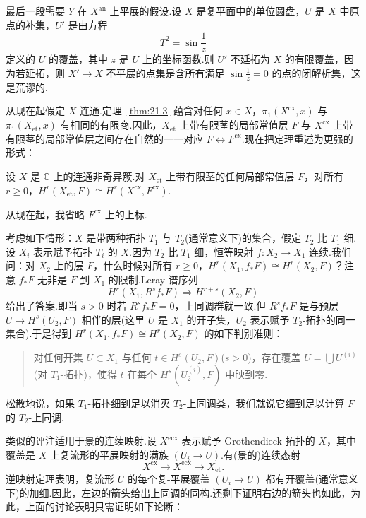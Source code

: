 \begin{example}\label{ex:21.4}
最后一段需要 $Y$ 在 $X^{\mathrm{an}}$ 上平展的假设.设 $X$ 是复平面中的单位圆盘，$U$ 是 $X$ 中原点的补集，$U'$ 是由方程
\[
T^{2} = \sin\frac{1}{z}
\]
定义的 $U$ 的覆盖，其中 $z$ 是 $U$ 上的坐标函数.则 $U'$ 不延拓为 $X$ 的有限覆盖，因为若延拓，则 $X' \to X$ 不平展的点集是含所有满足 $\sin\frac{1}{z} = 0$ 的点的闭解析集，这是荒谬的.
\end{example}

从现在起假定 $X$ 连通.定理~\ref{thm:21.3} 蕴含对任何 $x \in X$，$\pi_1(X^{\mathrm{cx}}, x)$ 与 $\pi_1(X_{\mathrm{et}}, x)$ 有相同的有限商.因此，$X_{\mathrm{et}}$ 上带有限茎的局部常值层 $F$ 与 $X^{\mathrm{cx}}$ 上带有限茎的局部常值层之间存在自然的一一对应 $F \leftrightarrow F^{\mathrm{cx}}$.现在把定理重述为更强的形式：

\begin{theorem}\label{thm:21.5}
设 $X$ 是 $\mathbb{C}$ 上的连通非奇异簇.对 $X_{\mathrm{et}}$ 上带有限茎的任何局部常值层 $F$，对所有 $r \geq 0$，$H^{r}(X_{\mathrm{et}}, F) \cong H^{r}(X^{\mathrm{cx}}, F^{\mathrm{cx}})$.
\end{theorem}

从现在起，我省略 $F^{\mathrm{cx}}$ 上的上标.

考虑如下情形：$X$ 是带两种拓扑 $T_1$ 与 $T_2$(通常意义下)的集合，假定 $T_2$ 比 $T_1$ 细.设 $X_i$ 表示赋予拓扑 $T_i$ 的 $X$.因为 $T_2$ 比 $T_1$ 细，恒等映射 $f \colon X_2 \to X_1$ 连续.我们问：对 $X_2$ 上的层 $F$，什么时候对所有 $r \geq 0$，$H^{r}(X_1, f_{*}F) \cong H^{r}(X_2, F)$？注意 $f_{*}F$ 无非是 $F$ 到 $X_1$ 的限制.Leray 谱序列
\[
H^{r}(X_1, R^{s}f_{*}F) \Rightarrow H^{r+s}(X_2, F)
\]
给出了答案.即当 $s > 0$ 时若 $R^{s}f_{*}F = 0$，上同调群就一致.但 $R^{s}f_{*}F$ 是与预层 $U \mapsto H^{s}(U_2, F)$ 相伴的层(这里 $U$ 是 $X_1$ 的开子集，$U_2$ 表示赋予 $T_2$-拓扑的同一集合).于是得到 $H^{r}(X_1, f_{*}F) \cong H^{r}(X_2, F)$ 的如下判别准则：
\begin{quote}
对任何开集 $U \subset X_1$ 与任何 $t \in H^{s}(U_2, F)$($s > 0$)，存在覆盖 $U = \bigcup U^{(i)}$(对 $T_1$-拓扑)，使得 $t$ 在每个 $H^{s}(U^{(i)}_2, F)$ 中映到零.
\end{quote}
松散地说，如果 $T_1$-拓扑细到足以消灭 $T_2$-上同调类，我们就说它细到足以计算 $F$ 的 $T_2$-上同调.

类似的评注适用于景的连续映射.设 $X^{\mathrm{ecx}}$ 表示赋予 Grothendieck 拓扑的 $X$，其中覆盖是 $X$ 上复流形的平展映射的满族 $(U_i \to U)$.有(景的)连续态射
\[
X^{\mathrm{cx}} \to X^{\mathrm{ecx}} \to X_{\mathrm{et}}.
\]
逆映射定理表明，复流形 $U$ 的每个复-平展覆盖 $(U_i \to U)$ 都有开覆盖(通常意义下)的加细.因此，左边的箭头给出上同调的同构.还剩下证明右边的箭头也如此，为此，上面的讨论表明只需证明如下论断：

